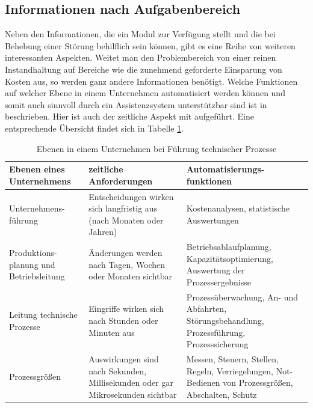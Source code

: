 \subsection{Informationen nach Aufgabenbereich}
Neben den Informationen, die ein Modul zur Verfügung stellt und die bei Behebung einer Störung behilflich sein können, gibt es eine Reihe von weiteren interessanten Aspekten. Weitet man den Problembereich von einer reinen Instandhaltung auf Bereiche wie die zunehmend geforderte Einsparung von Kosten aus, so werden ganz andere Informationen benötigt. Welche Funktionen auf welcher Ebene in einem Unternehmen automatisiert werden können und somit auch sinnvoll durch ein Assistenzsystem unterstützbar sind ist in \cite{Lauber1999} beschrieben. Hier ist auch der zeitliche Aspekt mit aufgeführt. Eine entsprechende Übersicht findet sich in Tabelle \ref{tab:Ebenen-Unternehmen}.
\begin{table}[htb]
\centering
\caption{Ebenen in einem Unternehmen bei Führung technischer Prozesse}
\label{tab:Ebenen-Unternehmen}
\begin{tabular}{|p{}|p{}|p{}|}
\hline
\textbf{Ebenen eines Unternehmens} & \textbf{zeitliche Anforderungen} & \textbf{Automatisierungs-funktionen} \\
\hline
Unternehmens-führung & Entscheidungen wirken sich langfristig aus (nach Monaten oder Jahren) & Kostenanalysen, statistische Auswertungen \\
\hline
Produktions-planung und Betriebsleitung & Änderungen werden nach Tagen, Wochen oder Monaten sichtbar & Betriebsablaufplanung, Kapazitätsoptimierung, Auswertung der Prozessergebnisse \\
\hline
Leitung technische Prozesse & Eingriffe wirken sich nach Stunden oder Minuten aus & Prozessüberwachung, An- und Abfahrten, Störungsbehandlung, Prozessführung, Prozesssicherung \\
\hline
Prozessgrößen & Auswirkungen sind nach Sekunden, Millisekunden oder gar Mikrosekunden sichtbar & Messen, Steuern, Stellen, Regeln, Verriegelungen, Not-Bedienen von Prozessgrößen, Abschalten, Schutz \\
\hline
\end{tabular}
\end{table}

